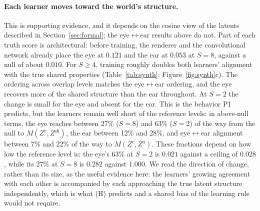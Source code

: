 \documentclass[11pt]{article}
\newcommand{\lr}{\ensuremath{\leftrightarrow}}
\begin{document}
\paragraph{Each learner moves toward the world's structure.} This is supporting evidence, and it depends on the cosine view of the latents described in Section~\ref{sec:formal}; the eye\lr{}ear results above do not. Part of each truth score is architectural: before training, the renderer and the convolutional network already place the eye at $0.121$ and the ear at $0.053$ at $S=8$, against a null of about $0.010$. For $S\geq4$, training roughly doubles both learners' alignment with the true shared properties (Table~\ref{tab:synth}; Figure~\ref{fig:synth}c). The ordering across overlap levels matches the eye\lr{}ear ordering, and the eye recovers more of the shared structure than the ear throughout. At $S=2$ the change is small for the eye and absent for the ear. This is the behavior P1 predicts, but the learners remain well short of the reference levels: in above-null terms, the eye reaches between 27\% ($S=8$) and 63\% ($S=2$) of the way from the null to $M(Z^e,Z^{\mathrm{sh}})$, the ear between 12\% and 28\%, and eye\lr{}ear alignment between 7\% and 22\% of the way to $M(Z^e,Z^a)$. These fractions depend on how low the reference level is: the eye's 63\% at $S=2$ is $0.021$ against a ceiling of $0.028$, while its 27\% at $S=8$ is $0.282$ against $1.000$. We read the direction of change, rather than its size, as the useful evidence here: the learners' growing agreement with each other is accompanied by each approaching the true latent structure independently, which is what (H) predicts and a shared bias of the learning rule would not require.
\end{document}
